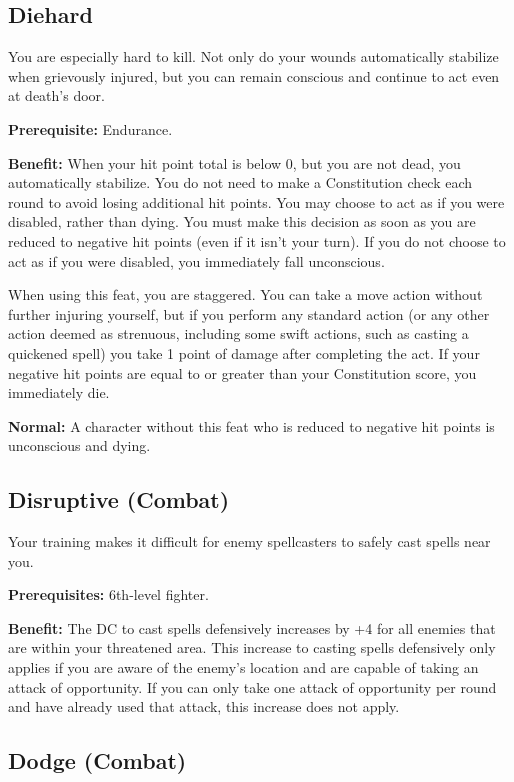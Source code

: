 \subsection{Diehard}

				
You are especially hard to kill. Not only do your wounds automatically stabilize when grievously injured, but you can remain conscious and continue to act even at death's door.
				
\textbf{Prerequisite:} Endurance.
				
\textbf{Benefit:} When your hit point total is below 0, but you are not dead, you automatically stabilize. You do not need to make a Constitution check each round to avoid losing additional hit points. You may choose to act as if you were disabled, rather than dying. You must make this decision as soon as you are reduced to negative hit points (even if it isn't your turn). If you do not choose to act as if you were disabled, you immediately fall unconscious.

When using this feat, you are staggered. You can take a move action without further injuring yourself, but if you perform any standard action (or any other action deemed as strenuous, including some swift actions, such as casting a quickened spell) you take 1 point of damage after completing the act. If your negative hit points are equal to or greater than your Constitution score, you immediately die.
				
\textbf{Normal:} A character without this feat who is reduced to negative hit points is unconscious and dying.
				
\subsection{Disruptive (Combat)}

				
Your training makes it difficult for enemy spellcasters to safely cast spells near you.
				
\textbf{Prerequisites:} 6th-level fighter.
				
\textbf{Benefit:} The DC to cast spells defensively increases by +4 for all enemies that are within your threatened area. This increase to casting spells defensively only applies if you are aware of the enemy's location and are capable of taking an attack of opportunity. If you can only take one attack of opportunity per round and have already used that attack, this increase does not apply.
				
\subsection{Dodge (Combat)}


